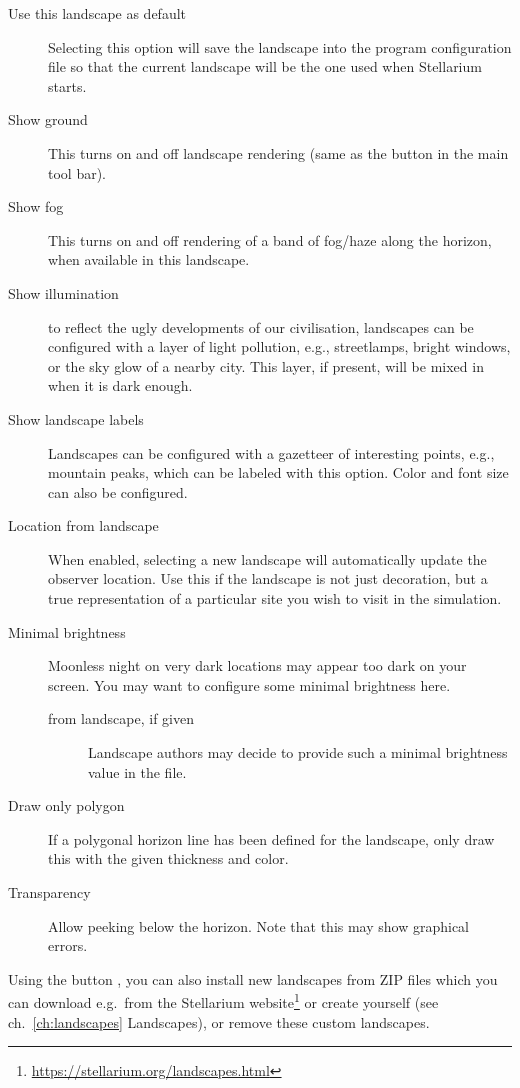 \begin{description}
\item[Use this landscape as default] Selecting this option will save
  the landscape into the program configuration file so that the current
  landscape will be the one used when Stellarium starts.
\item[Show ground] This turns on and off landscape rendering (same
  as the button  in the main tool bar).
\item[Show fog] This turns on and off rendering of a band of
  fog/haze along the horizon, when available in this landscape.
\item[Show illumination] to reflect the ugly developments of our
  civilisation, landscapes can be configured with a layer of light
  pollution, e.g., streetlamps, bright windows, or the sky glow of a
  nearby city. This layer, if present, will be mixed in when it is
  dark enough.
\item[Show landscape labels] Landscapes can be configured with a
  gazetteer of interesting points, e.g., mountain peaks, which can be
  labeled with this option. Color and font size can also be configured.
\item[Location from landscape] When enabled, selecting a
  new landscape will automatically update the observer location.
  Use this if the landscape is not just decoration, but a true
  representation of a particular site you wish to visit in the simulation.
\item[Minimal brightness] Moonless night on very dark locations may appear too dark
  on your screen. You may want to configure some minimal brightness here.
  \begin{description}
\item[from landscape, if given] Landscape authors may decide to
  provide such a minimal brightness value in the 
  file. 
  \end{description}
\item[Draw only polygon] If a polygonal horizon line has been
  defined for the landscape, only draw this with the given thickness and color.
\item[Transparency] Allow peeking below the horizon.  Note that this may show graphical errors. 
\end{description}

\noindent Using the button , you can also
install new landscapes from ZIP files which you can download e.g.\
from the Stellarium
website\footnote{\url{https://stellarium.org/landscapes.html}}
or create yourself (see ch.~\ref{ch:landscapes} Landscapes), or remove
these custom landscapes.

